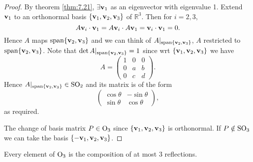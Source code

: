 \documentclass[10pt]{article}
\begin{document}
    \begin{proof}
        By theorem \ref{thm:7.21}, $ \exists {\bf v}_1 $ as an eigenvector with eigenvalue 1. Extend ${\bf v}_1$ to an orthonormal basis $ \{{\bf v}_1,{\bf v}_2,{\bf v}_3\} $ of $ \mathbb{R}^{3} $. Then for $i=2,3$,
        \[
            A{\bf v}_i \cdot {\bf v}_1 = A{\bf v}_i \cdot A{\bf v}_1 = {\bf v}_i \cdot {\bf v}_1 = 0.
        \]
        Hence $ A $ maps $ \operatorname{span}\{{\bf v}_2,{\bf v}_3\} $ and we can think of $A|_{\operatorname{span}\{{\bf v}_2,{\bf v}_3\}}$, $A$ restricted to $\operatorname{span}\{{\bf v}_2,{\bf v}_3\}$. Note that $\det A|_{\operatorname{span}\{{\bf v}_2,{\bf v}_3\}}=1$ since wrt $\{{\bf v}_1,{\bf v}_2,{\bf v}_3\}$ we have 
        \[
            A=\begin{pmatrix}
                1&0&0\\
                0&a& b\\
                0&c& d
            \end{pmatrix}.
        \]
        Hence $A|_{\operatorname{span}\{{\bf v}_2,{\bf v}_3\}}\in \mathrm{SO}_2$ and its matrix is of the form 
        \[
            \begin{pmatrix}
                \cos \theta& -\sin \theta\\
                \sin \theta& \cos \theta
            \end{pmatrix},
        \]
        as required.

        The change of basis matrix $P\in \mathrm{O}_3$ since $\{{\bf v}_1,{\bf v}_2,{\bf v}_3\}$ is orthonormal. If $P\notin \mathrm{SO}_3$ we can take the basis $ \{-{\bf v}_1,{\bf v}_2,{\bf v}_3\} $.
    \end{proof}
    \begin{corollary}\label{col:7.23}
        Every element of $\mathrm{O}_3$ is the composition of at most 3 reflections.
    \end{corollary}
\end{document}
